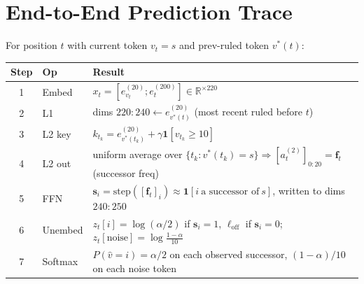 \documentclass[11pt]{article}
\newcommand{\ev}[2]{e^{(#1)}_{#2}}        %
\newcommand{\R}{\mathbb{R}}
\newcommand{\vstar}{v^{*}}
\newcommand{\fvec}{\mathbf{f}}
\newcommand{\one}{\mathbf{1}}
\begin{document}
\section{End-to-End Prediction Trace}
For position $t$ with current token $v_t=s$ and prev-ruled token $\vstar(t)$:
\begin{center}\small
\begin{tabular}{@{}clp{10.7cm}@{}}
\toprule
Step & Op & Result\\
\midrule
1 & Embed     & $x_t=[\ev{20}{v_t};\ev{200}{t}]\in\R^{\times220}$\\
2 & L1        & dims $220{:}240\leftarrow\ev{20}{\vstar(t)}$ (most recent ruled before $t$)\\
3 & L2 key    & $k_{t_k}=\ev{20}{\vstar(t_k)}+\gamma\one[v_{t_k}\!\ge\!10]$\\
4 & L2 out    & uniform average over $\{t_k:\vstar(t_k)=s\}\Rightarrow[a^{(2)}_t]_{0:20}=\fvec_t$ (successor freq)\\
5 & FFN       & $\mathbf{s}_i=\mathrm{step}([\fvec_t]_i)\approx\one[i\ \text{a successor of}\ s]$, written to dims $240{:}250$\\
6 & Unembed   & $z_t[i]=\log(\alpha/2)$ if $\mathbf{s}_i{=}1$, $\ell_{\mathrm{off}}$ if $\mathbf{s}_i{=}0$; $z_t[\text{noise}]=\log\frac{1-\alpha}{10}$\\
7 & Softmax   & $P(\hat v=i)=\alpha/2$ on each observed successor, $(1-\alpha)/10$ on each noise token\\
\bottomrule
\end{tabular}
\end{center}

\end{document}
